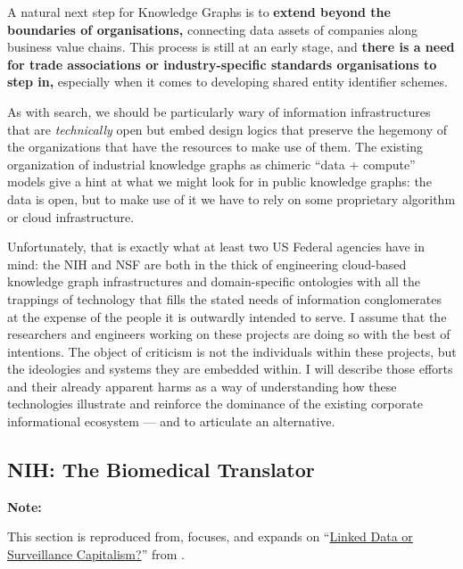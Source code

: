 \begin{leftbar}
A natural next step for Knowledge Graphs is to \textbf{extend beyond the
boundaries of organisations,} connecting data assets of companies along
business value chains. This process is still at an early stage, and
\textbf{there is a need for trade associations or industry-specific
standards organisations to step in,} especially when it comes to
developing shared entity identifier schemes. \cite{panExploitingLinkedData2017} 
\end{leftbar}

As with search, we should be particularly wary of information
infrastructures that are \emph{technically} open but embed
design logics that preserve the hegemony of the organizations that have
the resources to make use of them. The existing organization of
industrial knowledge graphs as chimeric ``data + compute'' models give a
hint at what we might look for in public knowledge graphs: the data is
open, but to make use of it we have to rely on some proprietary
algorithm or cloud infrastructure.

Unfortunately, that is exactly what at least two US Federal agencies
have in mind: the NIH and NSF are both in the thick of engineering
cloud-based knowledge graph infrastructures and domain-specific
ontologies with all the trappings of technology that fills the stated
needs of information conglomerates at the expense of the people it is
outwardly intended to serve. I assume that the researchers and engineers
working on these projects are doing so with the best of intentions. The
object of criticism is not the individuals within these projects, but
the ideologies and systems they are embedded within. I will describe
those efforts and their already apparent harms as a way of understanding
how these technologies illustrate and reinforce the dominance of the
existing corporate informational ecosystem --- and to articulate an
alternative.

\hypertarget{nih-the-biomedical-translator}{%
\subsection{NIH: The Biomedical
Translator}\label{nih-the-biomedical-translator}}

\textbf{Note:}

This section is reproduced from, focuses, and expands on
``\href{https://jon-e.net/infrastructure/\#linked-data-or-surveillance-capitalism}{Linked
Data or Surveillance Capitalism?}'' from \cite{saundersDecentralizedInfrastructureNeuro2022} .

